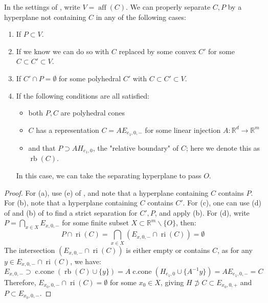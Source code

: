\begin{lemm}\label{lemm:017-polyhedral-proper-sep-special-case}
	In the settings of , write $V= \operatorname{aff}(C)$. We can properly separate $C, P$ by a hyperplane not containing $C$ in any of the following cases:
	\begin{enumerate}[label=(\alph*)]
		\item If $P\subset V$.
		\item If we know we can do so with $C$ replaced by some convex $C'$ for some $C\subset C'\subset V$.
		\item If $C'\cap P=\emptyset$ for some polyhedral $C'$ with $C\subset C'\subset V$.
		\item If the following conditions are all satisfied:
		      \begin{itemize}
			      \item both $P,C$ are polyhedral cones
			      \item $C$ has a representation $C=AE_{e_1,0,-}$ for some linear injection $A:\mathbb{R}^d\to \mathbb{R}^m$
			      \item and that $P\supset AH_{e_1,0}$, the "relative boundary" of $C$; here we denote this as $\operatorname{rb}(C)$.
		      \end{itemize}
		      In this case, we can take the separating hyperplane to pass $O$.
	\end{enumerate}
\end{lemm}

\begin{proof}
	For (a), use (e) of , and note that a hyperplane containing $C$ contains $P$. For (b), note that a hyperplane containing $C$ contains $C'$. For (c), one can use (d) of  and (b) of  to find a strict separation for $C', P$, and apply (b). For (d), write $P=\bigcap_{x\in X}E_{x,0,-}$ for some finite subset $X\subset \mathbb{R}^m\smallsetminus \{O\}$, then:
	\[
		P\cap \operatorname{ri}(C)=\bigcap_{x\in X}\left(E_{x,0,-}\cap \operatorname{ri}(C)\right)=\emptyset
	\]
	The intersection $\left(E_{x,0,-}\cap \operatorname{ri}(C)\right)$ is either empty or contains $C$, as for any $y\in E_{x,0,-}\cap\operatorname{ri}(C)$, we have:
	\[
		E_{x,0,-}\supset \operatorname{c.cone}\left(\operatorname{rb}(C)\cup \{y\}\right) = A\operatorname{c.cone}\left(H_{e_1,0} \cup \{A^{-1}y\}\right) = AE_{e_1,0,-} = C
	\]
	Therefore, $E_{x_0,0,-}\cap \operatorname{ri}(C)=\emptyset$ for some $x_0\in X$, giving $H\nsupset C\subset E_{x_0,0,+}$ and $P\subset E_{x_0,0,-}$.
\end{proof}

